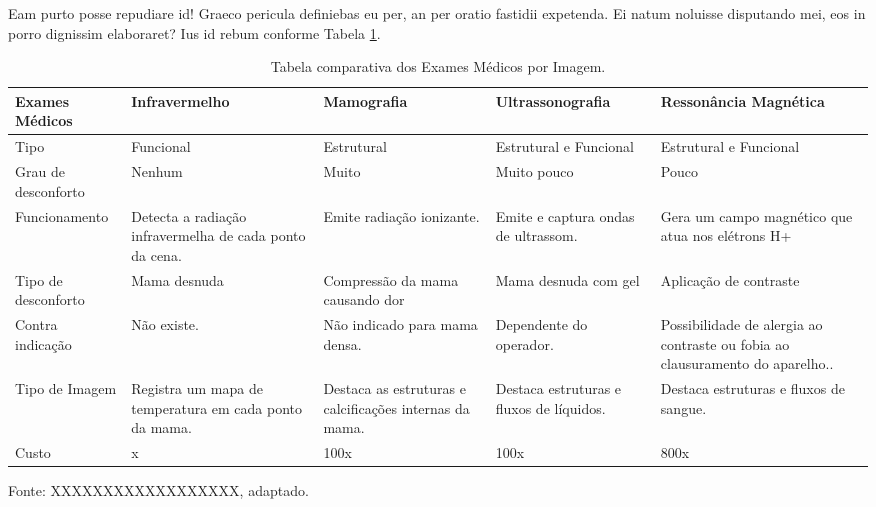 \documentclass[
	12pt,				%
	openright,			%
	oneside,			%
	a4paper,			%
	english,			%
	french,				%
	spanish,			%
	brazil,				%
	]{abntex2}
\begin{document}
Eam purto posse repudiare id! Graeco pericula definiebas eu per, an per oratio fastidii expetenda. Ei natum noluisse disputando mei, eos in porro dignissim elaboraret? Ius id rebum conforme Tabela \ref{tab: comparacao de exames}.
\begin{table}[ht]
    \centering
    \caption{Tabela comparativa dos Exames Médicos por Imagem.}
    \label{tab: comparacao de exames}
    \begin{tabular}{|p{2.8cm}|p{2.8cm}|p{2.8cm}|p{3.4cm}|p{2.8cm}|} 
        \hline
        \textbf{Exames Médicos} & \textbf{Infravermelho} & \textbf{Mamografia}  & \textbf{Ultrassonografia} & \textbf{Ressonância Magnética} \\ \hline
        
         Tipo & Funcional & Estrutural & Estrutural e Funcional & Estrutural e Funcional \\ \hline
         
        Grau de desconforto & Nenhum & Muito & Muito pouco & Pouco \\ \hline
        
        Funcionamento & Detecta a radiação infravermelha de cada ponto da cena. & Emite radiação ionizante. & Emite e captura ondas de ultrassom. & Gera um campo magnético que atua nos elétrons H+ \\ \hline
        
        Tipo de desconforto & Mama desnuda & Compressão da mama causando dor & Mama desnuda com gel & Aplicação de contraste \\ \hline
        
        Contra indicação & Não existe. & Não indicado para mama densa. & Dependente do operador. & Possibilidade de alergia ao contraste ou fobia ao clausuramento do aparelho..  \\ \hline
        
        Tipo de Imagem &  Registra um mapa de temperatura em cada ponto da mama. & Destaca as estruturas e calcificações internas da mama. & Destaca estruturas e fluxos de líquidos. & Destaca estruturas e fluxos de sangue. \\ \hline
        
        Custo & x & 100x & 100x & 800x \\ \hline
    \end{tabular}
    \newline \newline Fonte: XXXXXXXXXXXXXXXXXX, adaptado.
\end{table}
\end{document}
